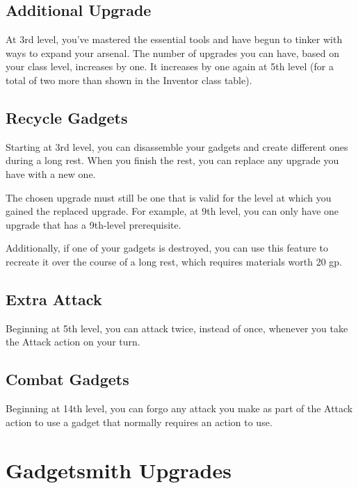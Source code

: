 \documentclass[11pt,twoside,openany]{book}  %
\begin{document}
\subsection{Additional Upgrade}

At 3rd level, you’ve mastered the essential tools and have begun to tinker with ways to expand your arsenal. The number of upgrades you can have, based on your class level, increases by one. It increases by one again at 5th level (for a total of two more than shown in the Inventor class table).

\subsection{Recycle Gadgets}

Starting at 3rd level, you can disassemble your gadgets and create different ones during a long rest. When you finish the rest, you can replace any upgrade you have with a new one.

The chosen upgrade must still be one that is valid for the level at which you gained the replaced upgrade. For example, at 9th level, you can only have one upgrade that has a 9th-level prerequisite.

Additionally, if one of your gadgets is destroyed, you can use this feature to recreate it over the course of a long rest, which requires materials worth 20 gp.

\subsection{Extra Attack}

Beginning at 5th level, you can attack twice, instead of once, whenever you take the Attack action on your turn.

\subsection{Combat Gadgets}

Beginning at 14th level, you can forgo any attack you make as part of the Attack action to use a gadget that normally requires an action to use.

\section{Gadgetsmith Upgrades}
\end{document}
